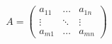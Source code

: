 \documentclass{jsarticle}
\begin{document}
\begin{equation*}
A = \begin{pmatrix}
    a_{11} & \ldots & a_{1n} \\
    \vdots & \ddots & \vdots \\
    a_{m1} & \ldots & a_{mn}
    \end{pmatrix}
\end{equation*}
\end{document}
